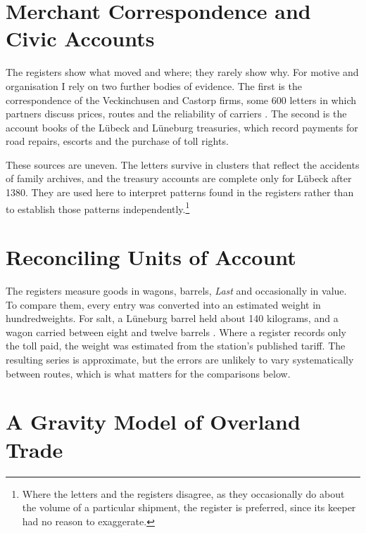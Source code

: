 \section{Merchant Correspondence and Civic Accounts}

The registers show what moved and where; they rarely show why. For motive and organisation I rely on two further bodies of evidence. The first is the correspondence of the Veckinchusen and Castorp firms, some 600 letters in which partners discuss prices, routes and the reliability of carriers \parencite{selzer2003}. The second is the account books of the Lübeck and Lüneburg treasuries, which record payments for road repairs, escorts and the purchase of toll rights.

These sources are uneven. The letters survive in clusters that reflect the accidents of family archives, and the treasury accounts are complete only for Lübeck after 1380. They are used here to interpret patterns found in the registers rather than to establish those patterns independently.\footnote{Where the letters and the registers disagree, as they occasionally do about the volume of a particular shipment, the register is preferred, since its keeper had no reason to exaggerate.}

\section{Reconciling Units of Account}

The registers measure goods in wagons, barrels, \emph{Last} and occasionally in value. To compare them, every entry was converted into an estimated weight in hundredweights. For salt, a Lüneburg barrel held about 140 kilograms, and a wagon carried between eight and twelve barrels \parencite{witthoft1976}. Where a register records only the toll paid, the weight was estimated from the station's published tariff. The resulting series is approximate, but the errors are unlikely to vary systematically between routes, which is what matters for the comparisons below.

\section{A Gravity Model of Overland Trade}

